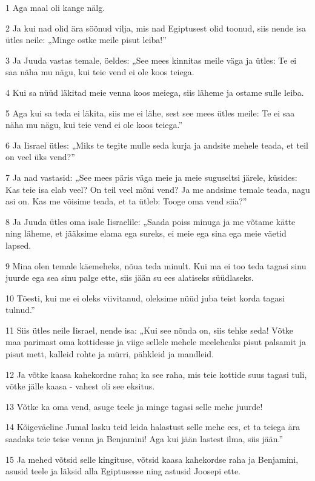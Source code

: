 \par 1 Aga maal oli kange nälg.
\par 2 Ja kui nad olid ära söönud vilja, mis nad Egiptusest olid toonud, siis nende isa ütles neile: „Minge ostke meile pisut leiba!”
\par 3 Ja Juuda vastas temale, öeldes: „See mees kinnitas meile väga ja ütles: Te ei saa näha mu nägu, kui teie vend ei ole koos teiega.
\par 4 Kui sa nüüd läkitad meie venna koos meiega, siis läheme ja ostame sulle leiba.
\par 5 Aga kui sa teda ei läkita, siis me ei lähe, sest see mees ütles meile: Te ei saa näha mu nägu, kui teie vend ei ole koos teiega.”
\par 6 Ja Iisrael ütles: „Miks te tegite mulle seda kurja ja andsite mehele teada, et teil on veel üks vend?”
\par 7 Ja nad vastasid: „See mees päris väga meie ja meie suguseltsi järele, küsides: Kas teie isa elab veel? On teil veel mõni vend? Ja me andsime temale teada, nagu asi on. Kas me võisime teada, et ta ütleb: Tooge oma vend siia?”
\par 8 Ja Juuda ütles oma isale Iisraelile: „Saada poiss minuga ja me võtame kätte ning läheme, et jääksime elama ega sureks, ei meie ega sina ega meie väetid lapsed.
\par 9 Mina olen temale käemeheks, nõua teda minult. Kui ma ei too teda tagasi sinu juurde ega sea sinu palge ette, siis jään su ees alatiseks süüdlaseks.
\par 10 Tõesti, kui me ei oleks viivitanud, oleksime nüüd juba teist korda tagasi tulnud.”
\par 11 Siis ütles neile Iisrael, nende isa: „Kui see nõnda on, siis tehke seda! Võtke maa parimast oma kottidesse ja viige sellele mehele meeleheaks pisut palsamit ja pisut mett, kalleid rohte ja mürri, pähkleid ja mandleid.
\par 12 Ja võtke kaasa kahekordne raha; ka see raha, mis teie kottide suus tagasi tuli, võtke jälle kaasa - vahest oli see eksitus.
\par 13 Võtke ka oma vend, asuge teele ja minge tagasi selle mehe juurde!
\par 14 Kõigeväeline Jumal lasku teid leida halastust selle mehe ees, et ta teiega ära saadaks teie teise venna ja Benjamini! Aga kui jään lastest ilma, siis jään.”
\par 15 Ja mehed võtsid selle kingituse, võtsid kaasa kahekordse raha ja Benjamini, asusid teele ja läksid alla Egiptusesse ning astusid Joosepi ette.
